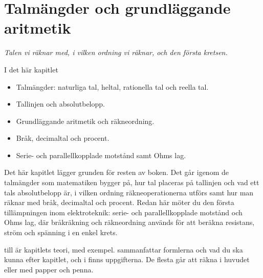 
\chapter{Talmängder och grundläggande aritmetik}
\label{c1:ch}

{\large\itshape Talen vi räknar med, i vilken ordning vi räknar, och den första kretsen.\par}

\begin{chapterbox}{I det här kapitlet}
\begin{itemize}
  \item Talmängder: naturliga tal, heltal, rationella tal och reella tal.
  \item Tallinjen och absolutbelopp.
  \item Grundläggande aritmetik och räkneordning.
  \item Bråk, decimaltal och procent.
  \item Serie- och parallellkopplade motstånd samt Ohms lag.
\end{itemize}
\end{chapterbox}

Det här kapitlet lägger grunden för resten av boken. Det går igenom de talmängder som
matematiken bygger på, hur tal placeras på tallinjen och vad ett tals absolutbelopp är, i vilken
ordning räkneoperationerna utförs samt hur man räknar med bråk, decimaltal och procent. Redan här
möter du den första tillämpningen inom elektroteknik: serie- och parallellkopplade motstånd och
Ohms lag, där bråkräkning och räkneordning används för att beräkna resistans, ström och spänning i
en enkel krets.

 till  är kapitlets teori, med exempel.
 sammanfattar formlerna och vad du ska kunna efter kapitlet, och i
 finns uppgifterna. De flesta går att räkna i huvudet eller med papper och
penna.




